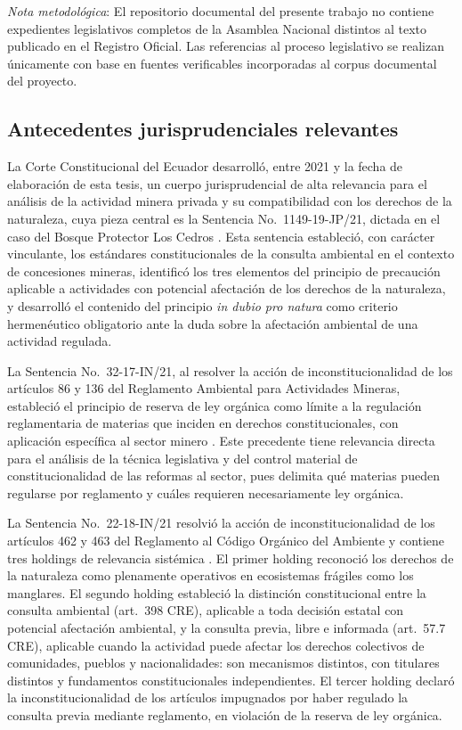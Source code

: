 \medskip
\noindent\textit{Nota metodológica}: El repositorio documental del presente trabajo no contiene expedientes legislativos completos de la Asamblea Nacional distintos al texto publicado en el Registro Oficial. Las referencias al proceso legislativo se realizan únicamente con base en fuentes verificables incorporadas al corpus documental del proyecto.

\subsection{Antecedentes jurisprudenciales relevantes}

La Corte Constitucional del Ecuador desarrolló, entre 2021 y la fecha de elaboración de esta tesis, un cuerpo jurisprudencial de alta relevancia para el análisis de la actividad minera privada y su compatibilidad con los derechos de la naturaleza, cuya pieza central es la Sentencia No.\ 1149-19-JP/21, dictada en el caso del Bosque Protector Los Cedros \parencite{cce_1149_19_jp_21}. Esta sentencia estableció, con carácter vinculante, los estándares constitucionales de la consulta ambiental en el contexto de concesiones mineras, identificó los tres elementos del principio de precaución aplicable a actividades con potencial afectación de los derechos de la naturaleza, y desarrolló el contenido del principio \textit{in dubio pro natura} como criterio hermenéutico obligatorio ante la duda sobre la afectación ambiental de una actividad regulada.

La Sentencia No.\ 32-17-IN/21, al resolver la acción de inconstitucionalidad de los artículos 86 y 136 del Reglamento Ambiental para Actividades Mineras, estableció el principio de reserva de ley orgánica como límite a la regulación reglamentaria de materias que inciden en derechos constitucionales, con aplicación específica al sector minero \parencite{cce_32_17_in_21}. Este precedente tiene relevancia directa para el análisis de la técnica legislativa y del control material de constitucionalidad de las reformas al sector, pues delimita qué materias pueden regularse por reglamento y cuáles requieren necesariamente ley orgánica.

La Sentencia No.\ 22-18-IN/21 resolvió la acción de inconstitucionalidad de los artículos 462 y 463 del Reglamento al Código Orgánico del Ambiente y contiene tres holdings de relevancia sistémica \parencite{cce_22_18_in_21}. El primer holding reconoció los derechos de la naturaleza como plenamente operativos en ecosistemas frágiles como los manglares. El segundo holding estableció la distinción constitucional entre la consulta ambiental (art.\ 398 CRE), aplicable a toda decisión estatal con potencial afectación ambiental, y la consulta previa, libre e informada (art.\ 57.7 CRE), aplicable cuando la actividad puede afectar los derechos colectivos de comunidades, pueblos y nacionalidades: son mecanismos distintos, con titulares distintos y fundamentos constitucionales independientes. El tercer holding declaró la inconstitucionalidad de los artículos impugnados por haber regulado la consulta previa mediante reglamento, en violación de la reserva de ley orgánica.

